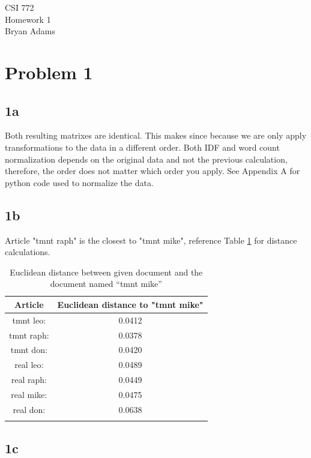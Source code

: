\documentclass[12pt]{article}
\begin{document}
CSI 772 \\
Homework 1 \\
Bryan Adams 

\section*{Problem 1}

\subsection*{1a}

Both resulting matrixes are identical. This makes since because we are only apply transformations to the data in a different order. Both IDF and word count normalization depends on the original data and not the previous calculation, therefore, the order does not matter which order you apply. See Appendix A for python code used to normalize the data.

\subsection*{1b}

Article "tmnt raph" is the closest to "tmnt mike", reference Table \ref{tmnt_mike} for distance calculations.

\begin{table}[h!]
    \centering
    \caption{Euclidean distance between given document and the document named “tmnt mike”}
    \vspace*{4mm}
    \label{tmnt_mike}
    \begin{tabular}{c|c}
        \Xhline{3\arrayrulewidth}
        Article & Euclidean distance to "tmnt mike" \\\hline
        tmnt leo: & 0.0412 \\
        tmnt raph:& 0.0378 \\
        tmnt don: & 0.0420 \\
        real leo: & 0.0489 \\
        real raph:& 0.0449 \\
        real mike:& 0.0475 \\
        real don: & 0.0638 \\
        \Xhline{3\arrayrulewidth}
    \end{tabular}
\end{table}

\subsection*{1c}
\end{document}
